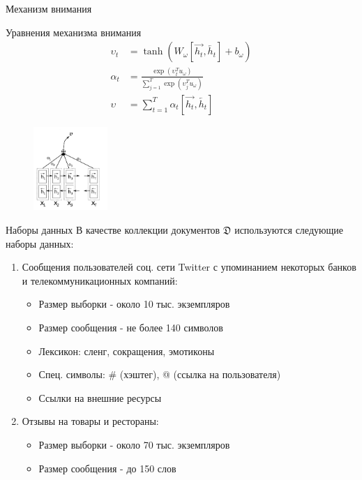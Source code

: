 \documentclass{beamer}
\begin{document}
\begin{frame}{Механизм внимания}
	\begin{block}{Уравнения механизма внимания}
	\begin{align}
	\upsilon_{t}&=\tanh{(W_{\omega}\left[\overrightarrow{h_{t}},\overleftarrow{h_{t}}\right]+b_{\omega})}\\
	\alpha_{t}&=\frac{\exp{(\upsilon_{t}^{T}u_{\omega})}}{\sum_{j=1}^{T}\exp{(\upsilon_{j}^{T}u_{\omega})}}\\
	\upsilon&=\sum_{t=1}^{T}\alpha_{t}\left[\overrightarrow{h_{t}},\overleftarrow{h_{t}}\right]
	\end{align}	
	\end{block}
\begin{figure}[!h]
  \includegraphics[width=0.25\textwidth]{images/att_edited.png}
\end{figure}
\end{frame}
\begin{frame}{Наборы данных}
	В качестве коллекции документов $\mathfrak{D}$ используются следующие наборы данных:
	\begin{enumerate}
	\item Сообщения пользователей соц. сети Twitter с упоминанием некоторых банков и телекоммуникационных компаний:
		\begin{itemize}
		\item Размер выборки - около 10 тыс. экземпляров
		\item Размер сообщения - не более 140 символов
		\item Лексикон: сленг, сокращения, эмотиконы
		\item Спец. символы: \# (хэштег), @ (ссылка на пользователя)
		\item Ссылки на внешние ресурсы
		\end{itemize}
	\item Отзывы на товары и рестораны:
		\begin{itemize}
		\item Размер выборки - около 70 тыс. экземпляров
		\item Размер сообщения - до 150 слов
		\end{itemize}
	\end{enumerate}
\end{frame}
\end{document}
